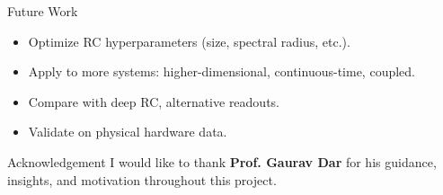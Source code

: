 \documentclass{beamer}
\begin{document}
\begin{frame}{Future Work}
  \begin{itemize}
    \item Optimize RC hyperparameters (size, spectral radius, etc.).
    \item Apply to more systems: higher-dimensional, continuous-time, coupled.
    \item Compare with deep RC, alternative readouts.
    \item Validate on physical hardware data.
  \end{itemize}
\end{frame}

\begin{frame}{Acknowledgement}
  I would like to thank \textbf{Prof. Gaurav Dar} for his guidance, insights, and motivation throughout this project.
\end{frame}
\end{document}
